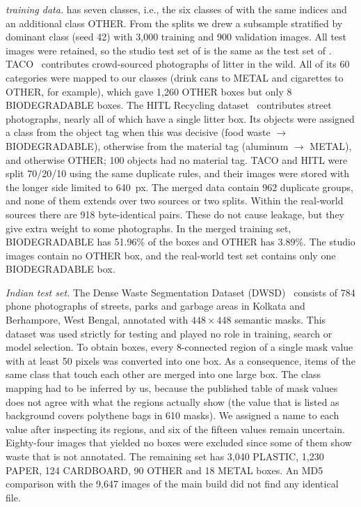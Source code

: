\textit{\gentwo training data.} \gentwo has seven classes, i.e., the six classes of \genone with the same indices and an additional class OTHER. From the \genone splits we drew a subsample stratified by dominant class (seed 42) with 3,000 training and 900 validation images. All test images were retained, so the studio test set of \gentwo is the same as the test set of \genone. TACO~\cite{proenca2020taco} contributes crowd-sourced photographs of litter in the wild. All of its 60 categories were mapped to our classes (drink cans to METAL and cigarettes to OTHER, for example), which gave 1,260 OTHER boxes but only 8 BIODEGRADABLE boxes. The HITL Recycling dataset~\cite{hitl2026recycling} contributes street photographs, nearly all of which have a single litter box. Its objects were assigned a class from the object tag when this was decisive (food waste $\to$ BIODEGRADABLE), otherwise from the material tag (aluminum $\to$ METAL), and otherwise OTHER; 100 objects had no material tag. TACO and HITL were split 70/20/10 using the same duplicate rules, and their images were stored with the longer side limited to 640~px. The merged data contain 962 duplicate groups, and none of them extends over two sources or two splits. Within the real-world sources there are 918 byte-identical pairs. These do not cause leakage, but they give extra weight to some photographs. In the merged training set, BIODEGRADABLE has 51.96\% of the boxes and OTHER has 3.89\%. The studio images contain no OTHER box, and the real-world test set contains only one BIODEGRADABLE box.

\textit{Indian test set.} The Dense Waste Segmentation Dataset (DWSD)~\cite{ali2025dwsd} consists of 784 phone photographs of streets, parks and garbage areas in Kolkata and Berhampore, West Bengal, annotated with $448\times448$ semantic masks. This dataset was used strictly for testing and played no role in training, search or model selection. To obtain boxes, every 8-connected region of a single mask value with at least 50 pixels was converted into one box. As a consequence, items of the same class that touch each other are merged into one large box. The class mapping had to be inferred by us, because the published table of mask values does not agree with what the regions actually show (the value that is listed as background covers polythene bags in 610 masks). We assigned a name to each value after inspecting its regions, and six of the fifteen values remain uncertain. Eighty-four images that yielded no boxes were excluded since some of them show waste that is not annotated. The remaining set has 3,040 PLASTIC, 1,230 PAPER, 124 CARDBOARD, 90 OTHER and 18 METAL boxes. An MD5 comparison with the 9,647 images of the main build did not find any identical file.

